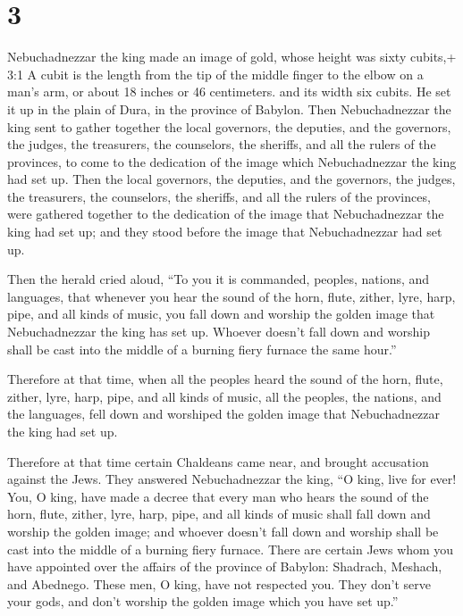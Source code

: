 \hypertarget{section-2}{%
\section{3}\label{section-2}}

 Nebuchadnezzar the king made an image of gold, whose height
was sixty cubits,+ 3:1 A cubit is the length from the tip of the middle
finger to the elbow on a man's arm, or about 18 inches or 46
centimeters. and its width six cubits. He set it up in the plain of
Dura, in the province of Babylon.  Then Nebuchadnezzar the
king sent to gather together the local governors, the deputies, and the
governors, the judges, the treasurers, the counselors, the sheriffs, and
all the rulers of the provinces, to come to the dedication of the image
which Nebuchadnezzar the king had set up.  Then the local
governors, the deputies, and the governors, the judges, the treasurers,
the counselors, the sheriffs, and all the rulers of the provinces, were
gathered together to the dedication of the image that Nebuchadnezzar the
king had set up; and they stood before the image that Nebuchadnezzar had
set up.

 Then the herald cried aloud, ``To you it is commanded,
peoples, nations, and languages,  that whenever you hear the
sound of the horn, flute, zither, lyre, harp, pipe, and all kinds of
music, you fall down and worship the golden image that Nebuchadnezzar
the king has set up.  Whoever doesn't fall down and worship
shall be cast into the middle of a burning fiery furnace the same
hour.''

 Therefore at that time, when all the peoples heard the
sound of the horn, flute, zither, lyre, harp, pipe, and all kinds of
music, all the peoples, the nations, and the languages, fell down and
worshiped the golden image that Nebuchadnezzar the king had set up.

 Therefore at that time certain Chaldeans came near, and
brought accusation against the Jews.  They answered
Nebuchadnezzar the king, ``O king, live for ever!  You, O
king, have made a decree that every man who hears the sound of the horn,
flute, zither, lyre, harp, pipe, and all kinds of music shall fall down
and worship the golden image;  and whoever doesn't fall
down and worship shall be cast into the middle of a burning fiery
furnace.  There are certain Jews whom you have appointed
over the affairs of the province of Babylon: Shadrach, Meshach, and
Abednego. These men, O king, have not respected you. They don't serve
your gods, and don't worship the golden image which you have set up.''


